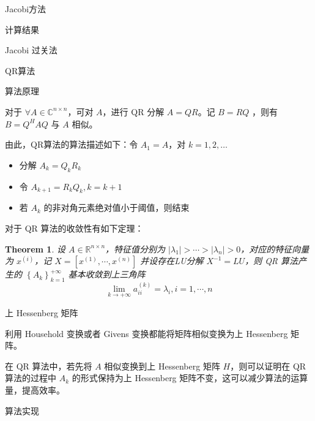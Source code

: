 \documentclass[a4paper]{article}
\newtheorem{myThm}{Theorem}
\begin{document}
\begin{multicols}{2}
\begin{section}{Jacobi方法}
\begin{subsection}{计算结果}
\begin{subsubsection}{Jacobi 过关法}
		\end{subsubsection}

	\end{subsection}

\end{section}


\begin{section}{QR算法}

	\begin{subsection}{算法原理}
		
		对于 $\forall A \in \mathbb{C}^{n \times n}$，可对 $A$，进行 QR 分解 $A=QR$。记 $B=RQ$ ，则有 $B = Q^HAQ$ 与 $A$ 相似。
		
		由此，QR算法的算法描述如下：令 $A_1 = A$，对 $k=1,2,\dots$
		
		\begin{itemize}
			\item 分解 $A_k = Q_k R_k$
			\item 令 $A_{k+1} = R_k Q_k, k=k+1$
			\item 若 $A_k$ 的非对角元素绝对值小于阈值，则结束
		\end{itemize}
		
		对于 QR 算法的收敛性有如下定理：
		
		\begin{myThm}
			
			设 $A \in \mathbb{R}^{n \times n}$，特征值分别为 $|\lambda_1| > \cdots > |\lambda_n| >0$，对应的特征向量为 $x^{(i)}$，记 $X = [x^(	1), \cdots, x^(n)]$ 并设存在LU分解 $X^{-1}=LU$，则 QR 算法产生的 $\left\{A_{k}\right\}_{k=1}^{+\infty}$ 基本收敛到上三角阵  $$\lim _{k \rightarrow+\infty} a_{i i}^{(k)}=\lambda_{i}, i=1, \cdots, n$$
			 	
		\end{myThm}
		
		\begin{subsubsection}{上 Hessenberg 矩阵}
		
			利用 Household 变换或者 Givens 变换都能将矩阵相似变换为上 Hessenberg 矩阵。 
		
			在 QR 算法中，若先将 $A$ 相似变换到上 Hessenberg 矩阵 $H$，则可以证明在 QR 算法的过程中 $A_k$ 的形式保持为上 Hessenberg 矩阵不变，这可以减少算法的运算量，提高效率。
			
		\end{subsubsection}
				
	\end{subsection}
	
	
	\begin{subsection}{算法实现}
	

\end{subsection}
\end{section}
\end{multicols}
\end{document}
